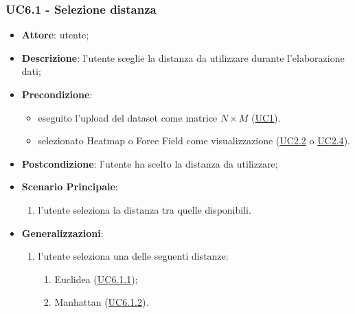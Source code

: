     \subsubsection{UC6.1 - Selezione distanza}
    \label{uc6.1}
    \begin{itemize}
    \item \textbf{Attore}: utente;
    \item \textbf{Descrizione}: l'utente sceglie la distanza da utilizzare durante l'elaborazione dati;
    \item \textbf{Precondizione}: 
    \begin{itemize}
        \item eseguito l'upload del dataset come matrice $N\times M$ (\hyperref[uc1]{UC1}).
        \item selezionato Heatmap o Force Field come visualizzazione (\hyperref[uc2.2]{UC2.2} o \hyperref[uc2.4]{UC2.4}).
    \end{itemize}  
    \item \textbf{Postcondizione}: l'utente ha scelto la distanza da utilizzare;
    \item \textbf{Scenario Principale}: 
    \begin{enumerate}
        \item l'utente seleziona la distanza tra quelle disponibili.
    \end{enumerate}
    \item \textbf{Generalizzazioni}:
        \begin{enumerate}
            \item l'utente seleziona una delle seguenti distanze:
                \begin{enumerate}
                    \item Euclidea (\hyperref[uc6.1.1]{UC6.1.1});
                    \item Manhattan (\hyperref[uc6.1.2]{UC6.1.2}).
                \end{enumerate}
        \end{enumerate}  
    \end{itemize}
    
